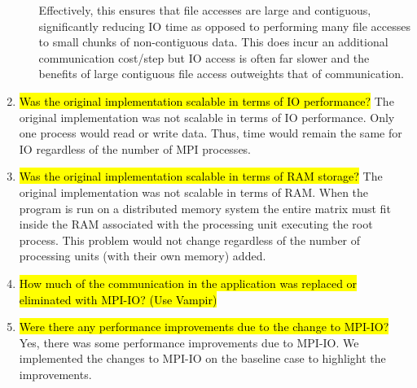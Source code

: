 \begin{enumerate}
\begin{enumerate}
	Effectively, this ensures that file accesses are large and contiguous, significantly reducing IO time as opposed to performing many file accesses to small chunks of non-contiguous data. This does incur an additional communication cost/step but IO access is often far slower and the benefits of large contiguous file access outweights that of communication.
	\end{enumerate}

  \item \hl{Was the original implementation scalable in terms of IO performance?}
  The original implementation was not scalable in terms of IO performance. Only one process would read or write data. Thus, time would remain the same for IO regardless of the number of MPI processes.
  
  \item \hl{Was the original implementation scalable in terms of RAM storage?}
  The original implementation was not scalable in terms of RAM. When the program is run on a distributed memory system the entire matrix must fit inside the RAM associated with the processing unit executing the root process. This problem would not change regardless of the number of processing units (with their own memory) added.
  
  \item \hl{How much of the communication in the application was replaced or eliminated with MPI-IO? (Use
Vampir)}

  \item \hl{Were there any performance improvements due to the change to MPI-IO?}
  Yes, there was some performance improvements due to MPI-IO. We implemented the changes to MPI-IO on the baseline case to highlight the improvements.

\end{enumerate}
